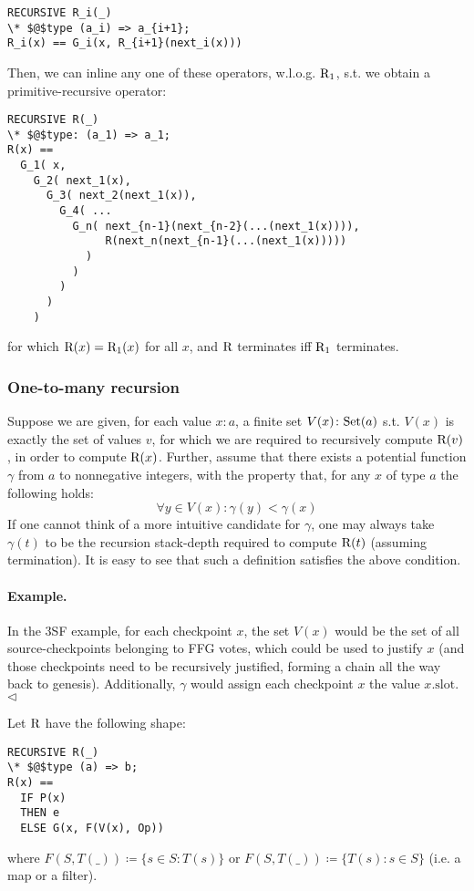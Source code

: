 \begin{lstlisting}[language=tla,columns=fullflexible]
RECURSIVE R_i(_)
\* $@$type (a_i) => a_{i+1};
R_i(x) == G_i(x, R_{i+1}(next_i(x)))
\end{lstlisting}
%
Then, we can inline any one of these operators, w.l.o.g. $\mathrm{R}_1$, s.t. we obtain a primitive-recursive operator:
\begin{lstlisting}[language=tla,columns=fullflexible]
RECURSIVE R(_)
\* $@$type: (a_1) => a_1;
R(x) ==
  G_1( x, 
    G_2( next_1(x),
      G_3( next_2(next_1(x)),
        G_4( ...
          G_n( next_{n-1}(next_{n-2}(...(next_1(x)))), 
               R(next_n(next_{n-1}(...(next_1(x)))))
            )
          )
        )
      )
    )
\end{lstlisting}
for which $\mathrm{R}(x) = \mathrm{R}_1(x)$ for all $x$, and $\mathrm{R}$ terminates iff $\mathrm{R}_1$ terminates.

\subsubsection{One-to-many recursion}

Suppose we are given, for each value $x: a$, a finite set $V(x)\colon \mathrm{Set}(a)$ s.t. $V(x)$ is exactly the set of values $v$, for which we are required to recursively compute $\mathrm{R}(v)$, in order to compute $\mathrm{R}(x)$. 
Further, assume that there exists a potential function $\gamma$ from $a$ to nonnegative integers, with the property that, for any $x$ of type $a$ the following holds:
\[
\forall y \in V(x)\colon \gamma(y) < \gamma(x) 
\]
%
If one cannot think of a more intuitive candidate for $\gamma$, one may always take $\gamma(t)$ to be the recursion stack-depth required to compute $\mathrm{R}(t)$ (assuming termination). It is easy to see that such a definition satisfies the above condition.

\paragraph{Example.} In the 3SF example, for each checkpoint $x$, the set $V(x)$ would be the set of all source-checkpoints belonging to FFG votes, which could be used to justify $x$ (and those checkpoints need to be recursively justified, forming a chain all the way back to genesis). Additionally, $\gamma$ would assign each checkpoint $x$ the value $x.\text{slot}$. \hfill $\triangleleft$

\noindent Let $\mathrm{R}$ have the following shape:
\begin{lstlisting}[language=tla,columns=fullflexible]
RECURSIVE R(_)
\* $@$type (a) => b;
R(x) ==
  IF P(x)
  THEN e
  ELSE G(x, F(V(x), Op))
\end{lstlisting}
%
where $F(S, T(\_)) \coloneqq \{s \in S\colon T(s)\}$ or $F(S, T(\_)) \coloneqq \{T(s)\colon s \in S\}$ (i.e. a map or a filter).
%
